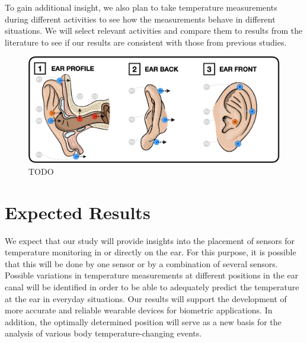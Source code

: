 To gain additional insight, we also plan to take temperature measurements during different activities to see how the measurements behave in different situations. We will select relevant activities and compare them to results from the literature to see if our results are consistent with those from previous studies.

\begin{figure}
    \centering
    \includegraphics[scale=0.26]{thesis-doc/images/ear_measurement_points/emp.png}
    \caption{TODO} %
    \label{fig:ear_measurement_positions}
\end{figure}

\section{Expected Results}
We expect that our study will provide insights into the placement of sensors for temperature monitoring in or directly on the ear.
For this purpose, it is possible that this will be done by one sensor or by a combination of several sensors.
Possible variations in temperature measurements at different positions in the ear canal will be identified in order to be able to adequately predict the temperature at the ear in everyday situations.
Our results will support the development of more accurate and reliable wearable devices for biometric applications. 
In addition, the optimally determined position will serve as a new basis for the analysis of various body temperature-changing events.